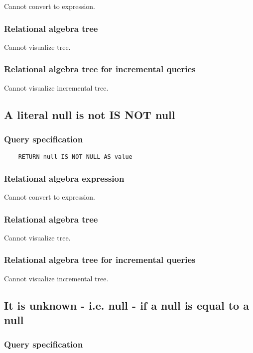 	Cannot convert to expression.

	\subsubsection*{Relational algebra tree}

	Cannot visualize tree.

	\subsubsection*{Relational algebra tree for incremental queries}

	Cannot visualize incremental tree.
	\subsection{A literal null is not IS NOT null}

	\subsubsection*{Query specification}

	\begin{lstlisting}
	RETURN null IS NOT NULL AS value
	\end{lstlisting}


	\subsubsection*{Relational algebra expression}

	Cannot convert to expression.

	\subsubsection*{Relational algebra tree}

	Cannot visualize tree.

	\subsubsection*{Relational algebra tree for incremental queries}

	Cannot visualize incremental tree.
	\subsection{It is unknown - i.e. null - if a null is equal to a null}

	\subsubsection*{Query specification}

